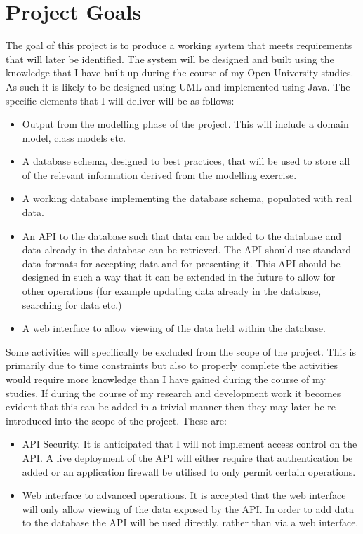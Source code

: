 \chapter{Project Goals} \label{goals}

The goal of this project is to produce a working system that meets 
requirements that will later be identified. The system will be designed and
built using the knowledge that I have built up during the course of my Open
University studies. As such it is likely to be designed using UML and
implemented using Java. The specific elements that I will deliver will be as
follows:
\begin{itemize}
  \item Output from the modelling phase of the project. This will include
  a domain model, class models etc.
  \item A database schema, designed to best practices, that will be used to
  store all of the relevant information derived from the modelling exercise.
  \item A working database implementing the database schema, populated with real
  data.
  \item An API to the database such that data can be added to the database and
  data already in the database can be retrieved. The API should use standard
  data formats for accepting data and for presenting it. This API should be
  designed in such a way that it can be extended in the future to allow for
  other operations (for example updating data already in the database, searching for data etc.)
  \item A web interface to allow viewing of the data held within the database.
\end{itemize}
Some activities will specifically be excluded from the scope of the project.
This is primarily due to time constraints but also to properly complete the
activities would require more knowledge than I have gained during the course of
my studies. If during the course of my research and development work it becomes
evident that this can be added in a trivial manner then they may later be
re-introduced into the scope of the project. These are:
\begin{itemize}
  \item API Security. It is anticipated that I will not implement access control
  on the API. A live deployment of the API will either require that
  authentication be added or an application firewall be utilised to only permit
  certain operations.
  \item Web interface to advanced operations. It is accepted that the web
  interface will only allow viewing of the data exposed by the API. In order to
  add data to the database the API will be used directly, rather than via a web
  interface.
\end{itemize}
